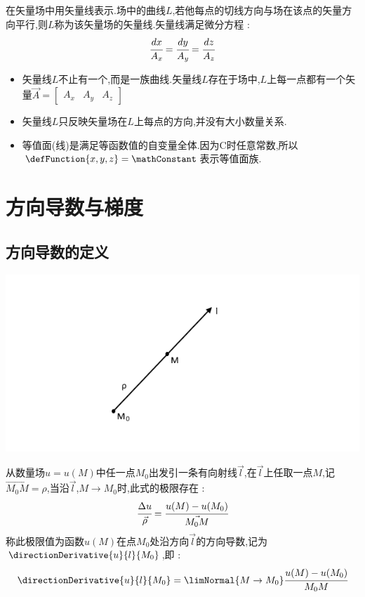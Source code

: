 {{{{      在矢量场中用矢量线表示.场中的曲线$L$,若他每点的切线方向与场在该点的矢量方向平行,则$L$称为该矢量场的矢量线.矢量线满足微分方程 :
      $$
        \cfrac{dx}{A_x} = \cfrac{dy}{A_y} = \cfrac{dz}{A_z}
      $$

      \begin{itemize}
        \item 矢量线$L$不止有一个,而是一族曲线.矢量线$L$存在于场中,$L$上每一点都有一个矢量$\vec{A} = \begin{bmatrix}
                  A_x & A_y & A_z
                \end{bmatrix}$
        \item 矢量线$L$只反映矢量场在$L$上每点的方向,并没有大小数量关系.
        \item 等值面(线)是满足等函数值的自变量全体.因为C时任意常数,所以$\defFunction{x,y,z} = \mathConstant$表示等值面族.
      \end{itemize}
    }%

   }%

  \section{方向导数与梯度}{

    \subsection{方向导数的定义}{
      \includegraphics{resources/directionDerivative1.png}

      从数量场$u= u(M)$中任一点$M_0$出发引一条有向射线$\vec{l}$,在$\vec{l}$上任取一点$M$,记$\vec{M_0M} = \rho$,当沿$\vec{l}$,$M \to M_0$时,此式的极限存在 :
      $$
        \cfrac{\Delta u}{\vec{\rho}} = \cfrac{u(M) - u(M_0)}{\vec{M_0M}}
      $$
      称此极限值为函数$u(M)$在点$M_0$处沿方向$\vec{l}$的方向导数,记为$\directionDerivative{u}{l}{M_0}$,即 :
      $$
        \directionDerivative{u}{l}{M_0} = \limNormal{M \to M_0}\cfrac{u(M) - u(M_0)}{M_0M}
      $$

}}}}
